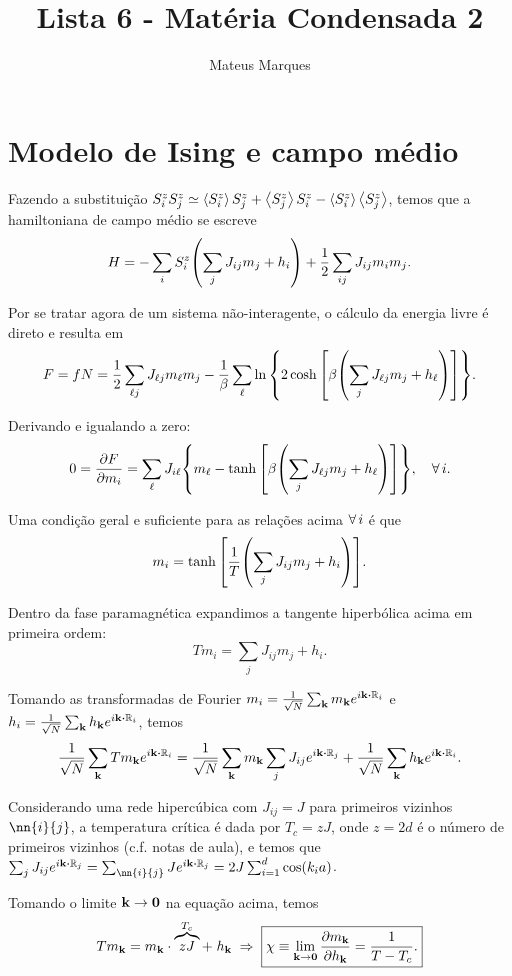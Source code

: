 \documentclass[a4paper,10pt]{article}
\title{\Huge{\textbf{Lista 6 - Matéria Condensada 2}}}
\author{Mateus Marques}
\begin{document}
\maketitle


\section{Modelo de Ising e campo médio}

Fazendo a substituição $S_i^z S_j^z \simeq \ev{S_i^z}S_j^z + \ev{S_j^z}S_i^z - \ev{S_i^z}\ev{S_j^z}$, temos que a hamiltoniana de campo médio se escreve
$$
H =
- \sum_{i} S_i^z
\qty(
\sum_{j} J_{ij} m_j + h_i
)
+
\frac{1}{2} \sum_{ij} J_{ij} m_i m_j.
$$

Por se tratar agora de um sistema não-interagente, o cálculo da energia livre é direto e resulta em
\begin{equation} \label{eq:free-energy}
F = f N =
\frac{1}{2} \sum_{\ell j} J_{\ell j} m_\ell m_j -
\frac{1}{\beta} \sum_{\ell}
\ln\qty{
2 \cosh\qty[
\beta \qty(
\sum_{j} J_{\ell j} m_j + h_\ell
) ] }.
\end{equation}

Derivando e igualando a zero:
$$
0 = \pdv{F}{m_i} = \sum_{\ell} J_{i\ell} \qty{ m_\ell -
\tanh\qty[
\beta \qty(
\sum_{j} J_{\ell j} m_j + h_\ell
) ] }, \quad \forall \, i.
$$

Uma condição geral e suficiente para as relações acima $\forall \, i$ é que
$$
m_i =
\tanh\qty[
\frac{1}{T} \qty(
\sum_{j} J_{ij} m_j + h_i
) ].
$$

Dentro da fase paramagnética expandimos a tangente hiperbólica acima em primeira ordem:
$$
T m_i = \sum_{j} J_{ij} m_j + h_i.
$$

Tomando as transformadas de Fourier $m_i = \frac{1}{\sqrt{N}} \sum_{\k} m_{\k} e^{i \k \vdot \R_i}$ e $h_i = \frac{1}{\sqrt{N}} \sum_{\k} h_{\k} e^{i \k \vdot \R_i}$, temos
$$
\frac{1}{\sqrt{N}} \sum_{\k} T m_{\k} e^{i \k \vdot \R_i} =
\frac{1}{\sqrt{N}} \sum_{\k} m_{\k} \sum_{j} J_{ij} e^{i \k \vdot \R_j} +
\frac{1}{\sqrt{N}} \sum_{\k} h_{\k} e^{i \k \vdot \R_i}.
$$

Considerando uma rede hipercúbica com $J_{ij} = J$ para primeiros vizinhos $\nn{i}{j}$, a temperatura crítica é dada por $T_c = z J$, onde $z = 2d$ é o número de primeiros vizinhos (c.f. notas de aula), e temos que $\sum_{j} J_{ij} e^{i \k \vdot \R_j} = \sum_{\nn{i}{j}} J e^{i \k \vdot \R_j} = 2J \sum_{i=1}^{d} \cos(k_i a)$.

Tomando o limite $\vb{k} \to \vb{0}$ na equação acima, temos
$$
T m_{\vb{k}} = m_{\vb{k}} \cdot \overbrace{z J}^{T_c} + \; h_{\vb{k}} \; \Rightarrow \;
\boxed{ \chi \equiv \lim_{\vb{k} \to \vb{0}} \pdv{m_{\vb{k}}}{h_{\vb{k}}} = \frac{1}{T - T_c}. }
$$
\end{document}
